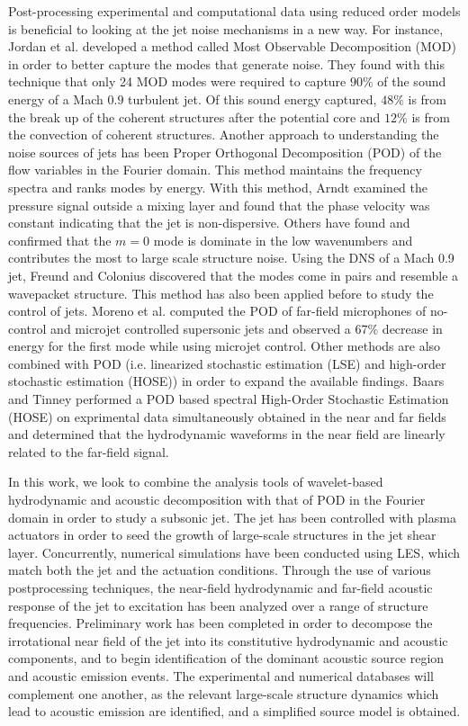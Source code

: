 \documentclass[english]{aiaa-tc}
\begin{document}
Post-processing experimental and computational data using reduced order models is beneficial to looking at the jet noise mechanisms in a new way.
 For instance, Jordan et al.\cite{jordan2007} developed a method called Most Observable Decomposition (MOD) in order to better capture the modes that generate noise. They found with this technique that only 24 MOD modes were required to capture $90\%$ of the sound energy of a Mach $0.9$ turbulent jet. Of this sound energy captured, $48\%$ is from the break up of the coherent structures after the potential core and $12\%$ is from the convection of coherent structures. 
Another approach to understanding the noise sources of jets has been Proper Orthogonal Decomposition (POD) of the flow variables in the Fourier domain. This method maintains the frequency spectra and ranks modes by energy. 
With this method, Arndt\cite{Arndt1997} examined the pressure signal outside a mixing layer and found that the phase velocity was constant indicating that the jet is non-dispersive.  
Others have found and confirmed that the $m=0$ mode is dominate in the low wavenumbers and contributes the most to large scale structure noise.\cite{hall2007,tinney2007}  
Using the DNS of a Mach 0.9 jet, Freund and Colonius\cite{freund2002} discovered that the modes come in pairs and resemble a wavepacket structure.
This method has also been applied before to study the control of jets. Moreno et al.\cite{moreno2003} computed the POD of far-field microphones of no-control and microjet controlled supersonic jets and observed a  $67\%$ decrease in energy for the first mode while using microjet control.
Other methods are also combined with POD (i.e. linearized stochastic estimation (LSE) and high-order stochastic estimation (HOSE)) in order to expand the available findings. Baars and Tinney\cite{baars2010} performed a POD based spectral High-Order Stochastic Estimation (HOSE) on exprimental data simultaneously obtained in the near and far fields and determined that the hydrodynamic waveforms in the near field are linearly related to the far-field signal. 

In this work, we look to combine the analysis tools of wavelet-based hydrodynamic and acoustic decomposition with that of POD in the Fourier domain in order to study a subsonic jet. 
The jet has been controlled with plasma actuators in order to seed the growth of large-scale structures in the jet shear layer. Concurrently, numerical simulations have been conducted using LES, which match both the jet and the actuation conditions. Through the use of various postprocessing techniques, the near-field hydrodynamic and far-field acoustic response of the jet to excitation has been analyzed over a range of structure frequencies. Preliminary work has been completed in order to decompose the irrotational near field of the jet into its constitutive hydrodynamic and acoustic components, and to begin identification of the dominant acoustic source region and acoustic emission events. The experimental and numerical databases will complement one another, as the relevant large-scale structure dynamics which lead to acoustic emission are identified, and a simplified source model is obtained. 
\end{document}
